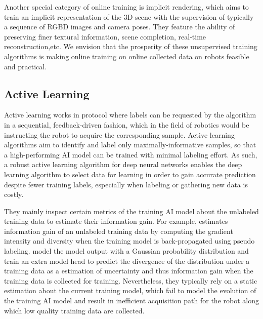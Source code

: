 Another special category of online training is implicit rendering\cite{li2022bnvfusion,camps2022learning,zhu_nice-slam_2022}, which aims to train an implicit representation of the 3D scene with the supervision of typically a sequence of RGBD images and camera poses.
They feature the ability of preserving finer textural information, scene completion, real-time reconstruction,etc. 
We envision that the prosperity of these unsupervised training algorithms is making online training on online collected data on robots feasible and practical.

\subsection{Active Learning}
Active learning \cite{ash2020deep,nguyen2022measure} works in protocol where labels can be requested by the algorithm in a sequential, feedback-driven fashion, which in the field of robotics would be instructing the robot to acquire the corresponding sample. 
Active learning algorithms aim to identify and label only maximally-informative samples, so that a high-performing AI model can be trained with minimal labeling effort. 
As such, a robust active learning algorithm for deep neural networks enables the deep learning algorithm to select data for learning in order to gain accurate prediction despite fewer training labels, especially when labeling or gathering new data is costly.

They mainly inspect certain metrics of the training AI model about the unlabeled training data to estimate their information gain.
For example, \cite{ash2020deep} estimates information gain of an unlabeled training data by computing the gradient intensity and diversity when the training model is back-propagated using pseudo labeling.
\cite{avidan_activenerf_2022,jin_neu-nbv_2023} model the model output with a Gaussian probability distribution and train an extra model head to predict the divergence of the distribution under a training data as a estimation of uncertainty and thus information gain when the training data is collected for training.
Nevertheless, they typically rely on a static estimation about the current training model, which fail to model the evolution of the training AI model and result in inefficient acquisition path for the robot along which low quality training data are collected.


